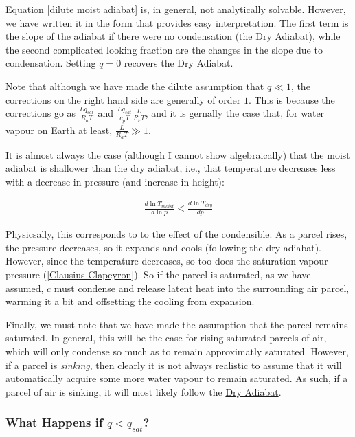 Equation \ref{dilute moist adiabat} is, in general, not analytically solvable. However, we have written it in the form that provides easy interpretation. The first term is the slope of the adiabat if there were no condensation (the \hyperref[Dry Adiabat]{Dry Adiabat}), while the second complicated looking fraction are the changes in the slope due to condensation. Setting $q=0$ recovers the Dry Adiabat.

Note that although we have made the dilute assumption that $q\ll 1$, the corrections on the right hand side are generally of order $1$. This is because the corrections go as $\frac{L q_{sat}}{R_a T}$ and $\frac{Lq_{sat}}{c_p T}\frac{L}{R_cT}$, and it is gernally the case that, for water vapour on Earth at least, $\frac{L}{R_a T}\gg 1$.

It is almost always the case (although I cannot show algebraically) that the moist adiabat is shallower than the dry adiabat, i.e., that temperature decreases less with a decrease in pressure (and increase in height): 

\begin{align*}
    \frac{d\ln T_{moist}}{d\ln p} < \frac{d\ln T_{dry}}{dp}
\end{align*}

Physicsally, this corresponds to to the effect of the condensible. As a parcel rises, the pressure decreases, so it expands and cools (following the dry adiabat). However, since the temperature decreases, so too does the saturation vapour pressure (\ref{Clausius Clapeyron}). So if the parcel is saturated, as we have assumed, $c$ must condense and release latent heat into the surrounding air parcel, warming it a bit and offsetting the cooling from expansion.

Finally, we must note that we have made the assumption that the parcel remains saturated. In general, this will be the case for rising saturated parcels of air, which will only condense so much as to remain approximatly saturated. However, if a parcel is \textit{sinking}, then clearly it is not always realistic to assume that it will automatically acquire some more water vapour to remain saturated. As such, if a parcel of air is sinking, it will most likely follow the \hyperref[Dry Adiabat Box]{Dry Adiabat}. 

\subsubsection{What Happens if $q<q_{sat}$?}

